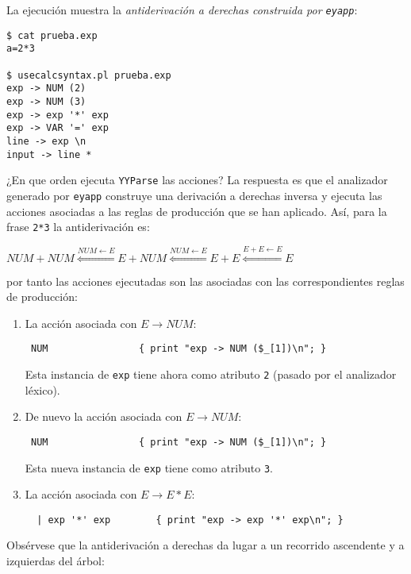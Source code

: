 
La ejecución muestra la \emph{antiderivación a derechas construida por {\tt eyapp}}:
\begin{verbatim}
$ cat prueba.exp
a=2*3

$ usecalcsyntax.pl prueba.exp
exp -> NUM (2)
exp -> NUM (3)
exp -> exp '*' exp
exp -> VAR '=' exp
line -> exp \n
input -> line *
\end{verbatim}



¿En que orden ejecuta \verb|YYParse| las acciones? 
La respuesta es que el analizador generado por 
\verb|eyapp| construye una derivación a derechas 
inversa y ejecuta las acciones asociadas a las reglas de producción
que se han aplicado. Así, para la frase \verb|2*3| la antiderivación es:

\begin{center}
\begin{math}
NUM + NUM \stackrel{NUM \leftarrow E}{\Longleftarrow} E + NUM \stackrel{NUM \leftarrow E}{\Longleftarrow} E + E \stackrel{E +E \leftarrow E}{\Longleftarrow} E
\end{math}
\end{center}

por tanto las acciones ejecutadas son las asociadas con las correspondientes reglas 
de producción:
\begin{enumerate}
\item
La acción asociada con $E \rightarrow NUM$:
\begin{verbatim}
 NUM                { print "exp -> NUM ($_[1])\n"; }
\end{verbatim}
Esta instancia de \verb|exp| tiene ahora como atributo \verb|2| (pasado por el analizador léxico).
\item
De nuevo la acción asociada con $E \rightarrow NUM$:
\begin{verbatim}
 NUM                { print "exp -> NUM ($_[1])\n"; }
\end{verbatim}
Esta nueva instancia de \verb|exp| tiene como atributo \verb|3|.
\item
La acción asociada con $E \rightarrow E * E$:
\begin{verbatim}
  | exp '*' exp        { print "exp -> exp '*' exp\n"; }
\end{verbatim}
\end{enumerate}
Obsérvese que la antiderivación a derechas da lugar a un
recorrido ascendente y a izquierdas del árbol:

